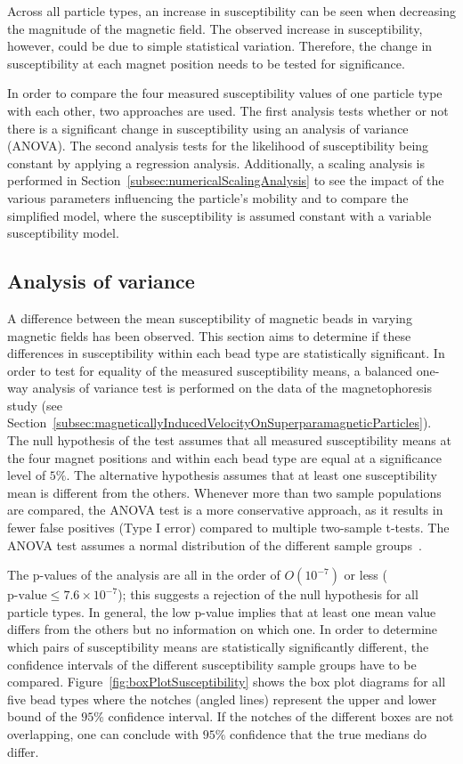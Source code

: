 
Across all particle types, an increase in susceptibility can be seen when decreasing the magnitude of the magnetic field. The observed increase in susceptibility, however, could be due to simple statistical variation. Therefore, the change in susceptibility at each magnet position needs to be tested for significance.

In order to compare the four measured susceptibility values of one particle type with each other, two approaches are used. The first analysis tests whether or not there is a significant change in susceptibility using an analysis of variance (ANOVA). The second analysis tests for the likelihood of susceptibility being constant by applying a regression analysis. Additionally, a scaling analysis is performed in Section~\ref{subsec:numericalScalingAnalysis} to see the impact of the various parameters influencing the particle's mobility and to compare the simplified model, where the susceptibility is assumed constant with a variable susceptibility model. 

\subsection{Analysis of variance}\label{subsec:analysisOfVariance}
A difference between the mean susceptibility of magnetic beads in varying magnetic fields has been observed. This section aims to determine if these differences in susceptibility within each bead type are statistically significant. In order to test for equality of the measured susceptibility means, a balanced one-way analysis of variance test is performed on the data of the magnetophoresis study (see Section~\ref{subsec:magneticallyInducedVelocityOnSuperparamagneticParticles}). The null hypothesis of the test assumes that all measured susceptibility means at the four magnet positions and within each bead type are equal at a significance level of $5\%$. The alternative hypothesis assumes that at least one susceptibility mean is different from the others. Whenever more than two sample populations are compared, the ANOVA test is a more conservative approach, as it results in fewer false positives (Type I error) compared to multiple two-sample t-tests. The ANOVA test assumes a normal distribution of the different sample groups~\cite{Diez2012}. 

The p-values of the analysis are all in the order of $O(10^{-7})$ or less ($\text{p-value}\leq 7.6\times 10^{-7}$); this suggests a rejection of the null hypothesis for all particle types. In general, the low p-value implies that at least one mean value differs from the others but no information on which one. In order to determine which pairs of susceptibility means are statistically significantly different, the confidence intervals of the different susceptibility sample groups have to be compared. Figure~\ref{fig:boxPlotSusceptibility} shows the box plot diagrams for all five bead types where the notches (angled lines) represent the upper and lower bound of the $95\%$ confidence interval. If the notches of the different boxes are not overlapping, one can conclude with $95\%$ confidence that the true medians do differ. 

